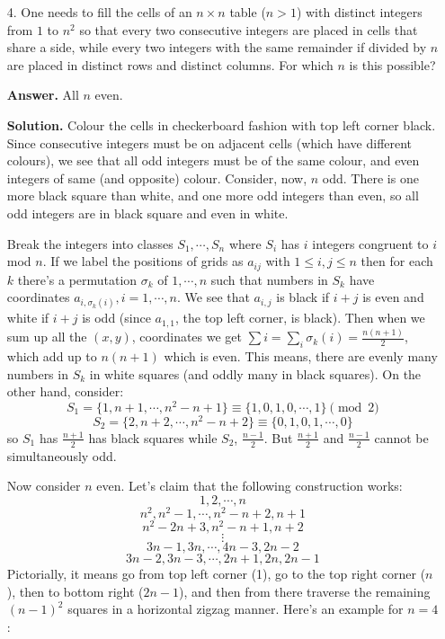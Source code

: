 \documentclass[11pt,a4paper]{article}
\begin{document}
\begin{enumerate}
	\item[4.]
	One needs to fill the cells of an $n\times n$ table ($n > 1$) with distinct integers from $1$ to $n^2$ so that every two consecutive integers are placed in cells that share a side, 
	while every two integers with the same remainder if divided by $n$ are placed in distinct rows and distinct columns. 
	For which $n$ is this possible?
	
	\textbf{Answer.} All $n$ even. 
	
	\textbf{Solution.} 
	Colour the cells in checkerboard fashion with top left corner black. 
	Since consecutive integers must be on adjacent cells (which have different colours), 
	we see that all odd integers must be of the same colour, and even integers of same (and opposite) colour. 
	Consider, now, $n$ odd. 
	There is one more black square than white, and one more odd integers than even, 
	so all odd integers are in black square and even in white. 
	
	Break the integers into classes $S_1, \cdots, S_n$ where $S_i$ has $i$ integers congruent to $i$ mod $n$. 
	If we label the positions of grids as $a_{ij}$ with $1\le i, j\le n$ then for each $k$ there's a permutation $\sigma_k$ of $1, \cdots, n$ such that numbers in $S_k$ have coordinates $a_{i, \sigma_k(i)}, i=1, \cdots, n$. 
	We see that $a_{i, j}$ is black if $i+j$ is even and white if $i+j$ is odd (since $a_{1, 1}$, the top left corner, is black). 
	Then when we sum up all the $(x, y)$, coordinates  we get $\sum i = \sum_i \sigma_k(i) = \frac{n(n+1)}{2}$, which add up to $n(n+1)$ which is even. 
	This means, there are evenly many numbers in $S_k$ in white squares (and oddly many in black squares). 
	On the other hand, consider: 
	\[
	S_1 = \{1, n+1, \cdots, n^2-n+1\}
	\equiv \{1, 0, 1, 0, \cdots, 1\}\pmod{2}
	\]\[
	S_2 = \{2, n+2, \cdots, n^2-n+2\}
	\equiv \{0, 1, 0, 1, \cdots, 0\}
	\]
	so $S_1$ has $\frac{n+1}{2}$ has black squares while $S_2$, $\frac{n-1}{2}$. 
	But $\frac{n+1}{2}$ and $\frac{n-1}{2}$ cannot be simultaneously odd. 
	
	Now consider $n$ even. Let's claim that the following construction works: 
	\[1, 2, \cdots, n
	\]
	\[n^2, n^2-1, \cdots, n^2-n+2, n+1
	\]
	\[n^2-2n+3 ,n^2-n+1,n+2
	\]
	\[
	\vdots
	\]
	\[
	3n-1, 3n, \cdots,  4n-3, 2n-2
	\]
	\[
	3n-2, 3n-3, \cdots, 2n+1, 2n, 2n-1
	\]
	Pictorially, it means go from top left corner (1), go to the top right corner ($n$), then to bottom right ($2n-1$), 
	and then from there traverse the remaining $(n-1)^2$ squares in a horizontal zigzag manner. 
	Here's an example for $n=4$: 
	

\end{enumerate}
\end{document}

